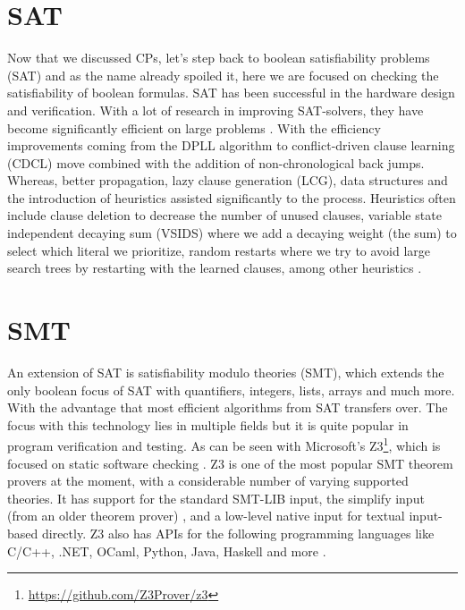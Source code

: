 
\section{SAT}
\label{CS:SAT}
Now that we discussed CPs, let's step back to boolean satisfiability problems (SAT) and as the name already spoiled it, here we are focused on checking the satisfiability of boolean formulas. SAT has been successful in the hardware design and verification. With a lot of research in improving SAT-solvers, they have become significantly efficient on large problems \cite{56bardin2019bringing}.
With the efficiency improvements coming from the DPLL algorithm to conflict-driven clause learning (CDCL) move combined with the addition of non-chronological back jumps. Whereas, better propagation, lazy clause generation (LCG), data structures and the introduction of heuristics assisted significantly to the process. Heuristics often include clause deletion to decrease the number of unused clauses, variable state independent decaying sum (VSIDS) where we add a decaying weight (the sum) to select which literal we prioritize, random restarts where we try to avoid large search trees by restarting with the learned clauses, among other heuristics \cite{61MCSMarcDenecker, 60katebi2011empirical, 67stuckey2010lazyClauseGeneration}.



\section{SMT}
\label{CS:SMT}
An extension of SAT is satisfiability modulo theories (SMT), which extends the only boolean focus of SAT with quantifiers, integers, lists, arrays and much more. With the advantage that most efficient algorithms from SAT transfers over. The focus with this technology lies in multiple fields but it is quite popular in program verification and testing. As can be seen with Microsoft's Z3\footnote{\url{https://github.com/Z3Prover/z3}}, which is focused on static software checking \cite{54moura2008z3}. Z3 is one of the most popular SMT theorem provers at the moment, with a considerable number of varying supported theories. It has support for the standard SMT-LIB input, the simplify input (from an older theorem prover) \cite{73detlefs2005simplify}, and a low-level native input for textual input-based directly. Z3 also has APIs for the following programming languages like C/C++, .NET, OCaml, Python, Java, Haskell and more \cite{64WikiSMT}.

